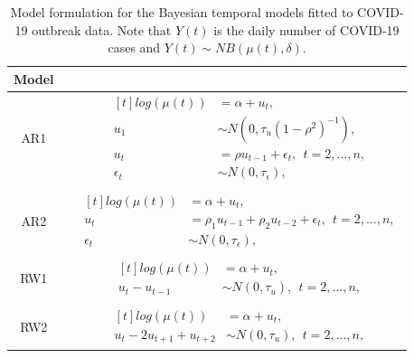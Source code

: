 \documentclass[10pt,letterpaper]{article}
\begin{document}
\begin{table}[!h]
	
	\caption{\label{tab:Models}Model formulation for the Bayesian temporal models fitted to COVID-19 outbreak data. Note that $Y(t)$ is the daily number of COVID-19 cases and \(Y(t) \sim NB(\mu(t), \delta)\).}
	\centering
	\begin{tabular}[t]{ccc}
		\hline
		Model& & \\
		\hline
		AR1& & $\begin{aligned}[t]
		log(\mu(t)) &= \alpha+u_t,\\
		u_1 &\sim N(0, \tau_u(1-\rho^2)^{-1}),\\
		u_t &=\rho u_{t-1} +\epsilon_t, \ \ t=2, \dots, n,\\
		\epsilon_t & \sim N(0, \tau_{\epsilon}),
		\end{aligned}$\\
		& & \\
		AR2& &$\begin{aligned}[t]
		log(\mu(t)) &= \alpha+u_t,\\
		u_t &=\rho_1 u_{t-1}+\rho_2 u_{t-2} +\epsilon_t, \ \ t=2, \dots, n,\\
		\epsilon_t & \sim N(0, \tau_{\epsilon}),
		\end{aligned}$\\
		& & \\
		RW1& &  $\begin{aligned}[t]
		log(\mu(t)) &= \alpha+u_t, \\
		u_t-u_{t-1} &\sim N(0, \tau_u), \ \ t=2, \dots, n,
		\end{aligned}$\\
		& & \\
		RW2& &  $\begin{aligned}[t]
		log(\mu(t)) &= \alpha+u_t, \\
		u_t-2u_{t+1}+u_{t+2} &\sim N(0, \tau_u), \ \ t=2, \dots, n,
		\end{aligned}$\\
		\hline
	\end{tabular}
\end{table}
\end{document}
